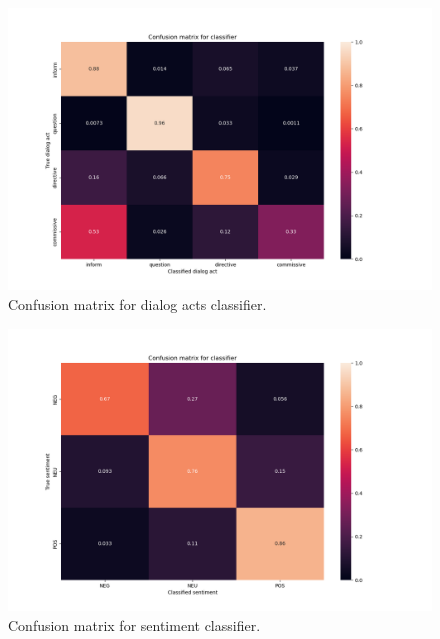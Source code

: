 \documentclass[11pt]{article}
\begin{document}
\begin{figure}
    \centering
    \includegraphics[scale=0.5]{img/da_classifier_conf_no_hist.png}
    \caption{Confusion matrix for dialog acts classifier.}
    \label{da_classifier_no_hist_conf}
\end{figure}

\begin{figure}
    \centering
    \includegraphics[scale=0.5]{img/sent_classifier_conf.png}
    \caption{Confusion matrix for sentiment classifier.}
    \label{sent_classifier_conf}
\end{figure}
\end{document}
